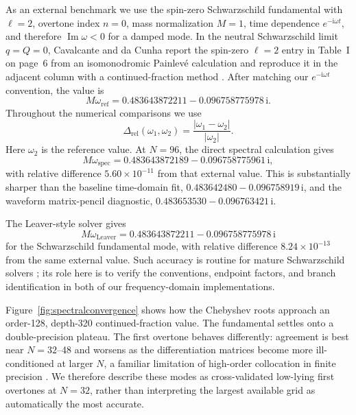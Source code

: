 \documentclass[12pt,a4paper]{article}
\newcommand{\ii}{\mathrm{i}}
\begin{document}
As an external benchmark we use the spin-zero Schwarzschild fundamental with
\(\ell=2\), overtone index \(n=0\), mass normalization \(M=1\), time dependence
\(e^{-\ii\omega t}\), and therefore \(\operatorname{Im}\omega<0\) for a damped
mode.  In the neutral Schwarzschild limit \(q=Q=0\), Cavalcante and da Cunha
report the spin-zero \(\ell=2\) entry in Table~I on page~6 from an
isomonodromic Painlev\'e calculation and reproduce it in the adjacent column
with a continued-fraction method \cite{Cavalcante2021}.  After matching our
\(e^{-\ii\omega t}\) convention, the value is
\begin{equation*}
M\omega_{\mathrm{ref}}=0.483643872211-0.096758775978\,\ii.
\end{equation*}
Throughout the numerical comparisons we use
\begin{equation*}
\Delta_{\mathrm{rel}}(\omega_1,\omega_2)
=\frac{|\omega_1-\omega_2|}{|\omega_2|}.
\end{equation*}
Here \(\omega_2\) is the reference value.
At \(N=96\), the direct spectral calculation gives
\begin{equation*}
M\omega_{\mathrm{spec}}=0.483643872189-0.096758775961\,\ii,
\end{equation*}
with relative difference \(5.60\times10^{-11}\) from that external value. This is substantially sharper than the baseline time-domain fit, \(0.483642480-0.096758919\,\ii\), and the waveform matrix-pencil diagnostic, \(0.483653530-0.096763421\,\ii\).

The Leaver-style solver gives
\begin{equation*}
M\omega_{\mathrm{Leaver}}=0.483643872211-0.096758775978\,\ii
\end{equation*}
for the Schwarzschild fundamental mode, with relative difference
\(8.24\times10^{-13}\) from the same external value. Such accuracy is routine
for mature Schwarzschild solvers \cite{Leaver1985,Cavalcante2021}; its role here
is to verify the conventions, endpoint factors, and branch identification in
both of our frequency-domain implementations.

Figure~\ref{fig:spectralconvergence} shows how the Chebyshev roots approach an
order-128, depth-320 continued-fraction value. The fundamental settles onto a
double-precision plateau. The first overtone behaves differently: agreement is
best near \(N=32\)--48 and worsens as the differentiation matrices become more
ill-conditioned at larger \(N\), a familiar limitation of high-order
collocation in finite precision \cite{Jansen2017}. We therefore describe these
modes as cross-validated low-lying first overtones at \(N=32\), rather than
interpreting the largest available grid as automatically the most accurate.
\end{document}
